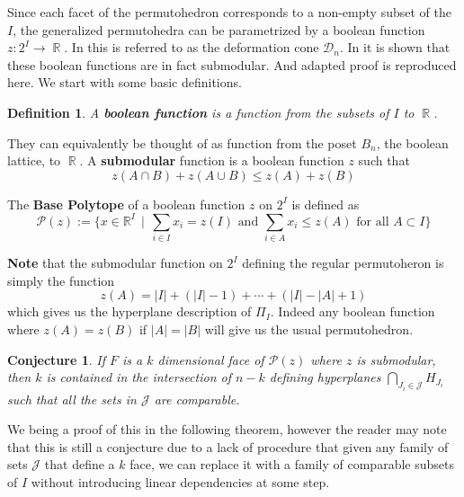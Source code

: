 \documentclass[12pt]{amsart}
\newtheorem{definition}{Definition}
\newtheorem{conj}[lemma]{Conjecture}
\numberwithin{equation}{section}
\newcommand{\RR}{\operatorname{\mathbb{R}}}
\newcommand{\pp}{\mathcal{P}}
\newcommand{\J}{\mathcal{J}}
\begin{document}
  Since each facet of the permutohedron 
corresponds to a non-empty subset of the $I$, the generalized permutohedra
can be parametrized by a boolean function $z:2^{I} \rightarrow \RR$. In  
 \cite{DokerThesis} this is referred to as the deformation
cone $\mathcal{D}_n$.  
In \cite{HopfMonoid} it is shown that these boolean functions are in fact
submodular.  And adapted proof is reproduced here.    We start with some basic definitions. 





\begin{definition} A {\bf boolean function} is a function from the subsets of $I$ to $\RR$.  
\end{definition}

They can equivalently be thought of as  function from the poset $B_n$, 
the boolean lattice, to $\RR$.   
A {\bf submodular} function is a boolean function $z$  such that 
$$ z(A\cap B) + z(A\cup B) \leq z(A) + z(B) $$




The {\bf Base Polytope} of a boolean function $z$ on $2^I$ is defined as  
$$ \pp(z) := \{ x\in \mathbb{R}^I     \  \   |   \  \  \sum_{i \in I} x_i = z(I) \text {   and   }   \sum_{i\in A} x_i \leq z(A) \text{ for all  } A\subset I \}$$

{\bf Note} that the submodular function on $2^I$ defining the regular permutoheron is simply the function 
$$ z(A) = |I| + (|I| - 1) + \cdots + (|I|- |A| + 1) $$ which gives us the hyperplane description of $\Pi_I$. Indeed any boolean function where $z(A)=z(B)$
if $|A|=|B|$ will give us the usual permutohedron. 

\begin{conj}
\label{conj:comparableSubets}
If $F$ is a $k$ dimensional face of $\pp(z)$ where $z$ is submodular,  then $k$ is contained
in the intersection of $n-k$ defining hyperplanes $\bigcap_{J_i\in \J} H_{J_i}$ such that all 
the sets in $\J$ are comparable. 
\end{conj}

We being a proof of this in the following theorem, however the reader may note that this
is still a conjecture due to a lack of procedure that given any family of sets $\J$ that define a $k$ 
face, we can replace it with a family of comparable subsets of $I$ without introducing
linear dependencies at some step. 


\end{document}
